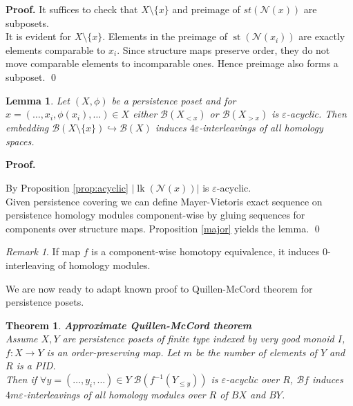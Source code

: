 \documentclass[a4paper, 12pt]{article}
\newcounter{stmcounter}[section]
\newcounter{thcounter}
\numberwithin{equation}{section}
\newtheorem{lemma}[stmcounter]{Lemma}
\newtheorem{theorem}[thcounter]{Theorem}
\theoremstyle{definition}
\theoremstyle{remark}
\newtheorem{remark}[stmcounter]{Remark}
\newenvironment{pf}{\noindent\textbf{Proof.}}{\qed}
\begin{document}
\begin{pf}
  It suffices to check that $X \setminus \{x\}$ and preimage of $st(\mathcal{N}(x))$ are subposets.\\

  It is evident for $X \setminus \{x\}$. Elements in the preimage of $\operatorname{st}(\mathcal{N}(x_i))$ are exactly elements comparable to $x_i$. Since structure maps preserve order, they do not move comparable elements to incomparable ones. Hence preimage also forms a subposet.
\end{pf}\\

\begin{lemma}
  Let $(X,\phi)$ be a persistence poset and for $x=(\ldots,x_i,\phi(x_i),\ldots) \in X$ either $\mathcal{B}(X_{< x})$ or $\mathcal{B}(X_{> x})$ is $\varepsilon$-acyclic. Then embedding $\mathcal{B}(X \setminus \{x\}) \hookrightarrow \mathcal{B}(X)$ induces $4\varepsilon$-interleavings of all homology spaces.
\end{lemma}

\begin{pf} ~ \par
  By Proposition \ref{prop:acyclic} $\left|\operatorname{lk}(\mathcal{N}(x))\right|$ is $\varepsilon$-acyclic.\\

  Given persistence covering we can define Mayer-Vietoris exact sequence on persistence homology modules component-wise by gluing sequences for components over structure maps. Proposition \ref{major} yields the lemma.
\end{pf}

\begin{remark}
  If map $f$ is a component-wise homotopy equivalence, it induces $0$-interleaving of homology modules.
\end{remark}

We are now ready to adapt known proof to Quillen-McCord theorem for persistence posets.

\begin{theorem} \textbf{Approximate Quillen-McCord theorem}\\
  Assume $X, Y$ are persistence posets of finite type indexed by very good monoid $I$, $f : X \to Y$ is an order-preserving map. Let $m$ be the number of elements of $Y$ and $R$ is a PID.\\

  Then if $\forall y=(\ldots,y_i,\ldots) \in Y\;\mathcal{B}(f^{-1}(Y_{\leqslant y}))$ is $\varepsilon$-acyclic over $R$, $\mathcal{B}f$ induces $4m\varepsilon$-interleavings of all homology modules over $R$ of $BX$ and $BY$.\\
\end{theorem}
\end{document}
